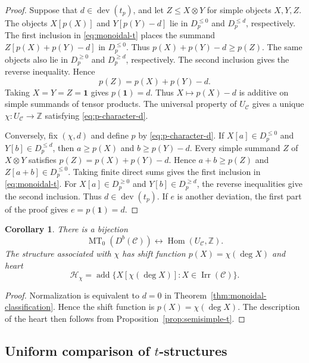 \documentclass[11pt]{amsart}
\newcommand{\C}{\mathcal C}
\newcommand{\Hh}{\mathcal H}
\newcommand{\one}{\mathbf 1}
\newcommand{\Irr}{\operatorname{Irr}}
\newcommand{\add}{\operatorname{add}}
\newcommand{\dev}{\operatorname{dev}}
\newcommand{\MT}{\operatorname{MT}}
\DeclareMathOperator{\Hom}{Hom}
\newtheorem{corollary}[theorem]{Corollary}
\theoremstyle{definition}
\theoremstyle{remark}
\theoremstyle{plain}
\begin{document}
\begin{proof}
Suppose that $d\in\dev(t_p)$, and let $Z\leq X\otimes Y$ for simple objects $X,Y,Z$. The objects $X[p(X)]$ and $Y[p(Y)-d]$ lie in $D_p^{\leq0}$ and $D_p^{\leq d}$, respectively. The first inclusion in \eqref{eq:monoidal-t} places the summand $Z[p(X)+p(Y)-d]$ in $D_p^{\leq0}$. Thus $p(X)+p(Y)-d\geq p(Z)$. The same objects also lie in $D_p^{\geq0}$ and $D_p^{\geq d}$, respectively. The second inclusion gives the reverse inequality. Hence
\begin{equation}\label{eq:fusion-p}
p(Z)=p(X)+p(Y)-d.
\end{equation}
Taking $X=Y=Z=\one$ gives $p(\one)=d$. Thus $X\mapsto p(X)-d$ is additive on simple summands of tensor products. The universal property of $U_{\C}$ gives a unique $\chi: U_{\C}\to\mathbb Z$ satisfying \eqref{eq:p-character-d}.

Conversely, fix $(\chi,d)$ and define $p$ by \eqref{eq:p-character-d}. If $X[a]\in D_p^{\leq0}$ and $Y[b]\in D_p^{\leq d}$, then $a\geq p(X)$ and $b\geq p(Y)-d$. Every simple summand $Z$ of $X\otimes Y$ satisfies $p(Z)=p(X)+p(Y)-d$. Hence $a+b\geq p(Z)$ and $Z[a+b]\in D_p^{\leq0}$. Taking finite direct sums gives the first inclusion in \eqref{eq:monoidal-t}. For $X[a]\in D_p^{\geq0}$ and $Y[b]\in D_p^{\geq d}$, the reverse inequalities give the second inclusion. Thus $d\in\dev(t_p)$. If $e$ is another deviation, the first part of the proof gives $e=p(\one)=d$.
\end{proof}

\begin{corollary}\label{cor:normalized-classification}
There is a bijection
\begin{equation*}
    \MT_0(D^b(\C)) \longleftrightarrow \Hom(U_{\C},\mathbb Z). 
\end{equation*}
The structure associated with $\chi$ has shift function $p(X)=\chi(\deg X)$ and heart
\[
\Hh_\chi=\add\{X[\chi(\deg X)]:X\in\Irr(\C)\}.
\]
\end{corollary}

\begin{proof}
Normalization is equivalent to $d=0$ in Theorem~\ref{thm:monoidal-classification}. Hence the shift function is $p(X)=\chi(\deg X)$. The description of the heart then follows from Proposition~\ref{prop:semisimple-t}.
\end{proof}

\subsection{Uniform comparison of \texorpdfstring{$t$}{t}-structures}\label{subsec:uniform-comparison}
\end{document}
